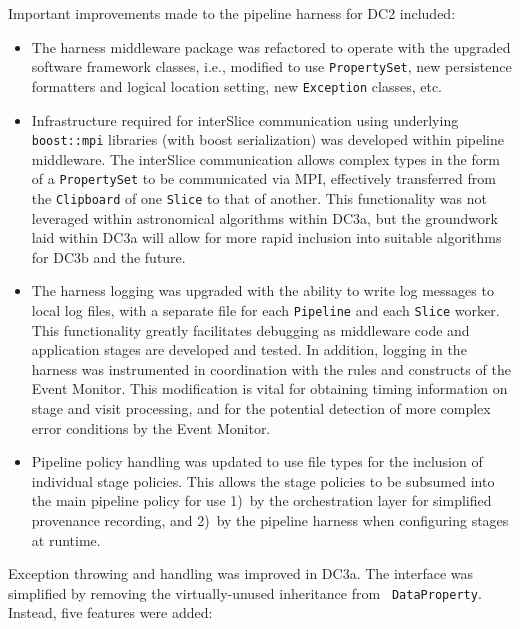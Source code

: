 Important improvements made to the pipeline harness for DC2 included:
\begin{itemize}
\item The harness middleware package was refactored to operate with the upgraded
software framework classes, i.e., modified to use {\tt PropertySet},
new persistence formatters and logical location setting, new {\tt Exception} classes, etc.
\item Infrastructure required for interSlice communication using underlying {\tt boost::mpi}
libraries (with boost serialization) was developed within pipeline middleware.
The interSlice communication allows complex types in the form of a {\tt PropertySet} to be
communicated via MPI, effectively transferred from the {\tt Clipboard} of
one {\tt Slice} to that of another.
This functionality was not leveraged within astronomical algorithms within DC3a, but
the groundwork laid within DC3a will allow for more rapid inclusion into suitable
algorithms for DC3b and the future.
\item The harness logging was upgraded with the ability to write log messages to
local log files, with a separate file for each {\tt Pipeline}
and each {\tt Slice} worker.
This functionality greatly facilitates debugging as middleware code and application
stages are developed and tested.  In addition, logging in the harness
was instrumented in coordination with the rules and constructs of the Event Monitor.
This modification is vital for obtaining timing information on stage and visit processing,
and for the potential detection of more complex error conditions by the Event Monitor.
\item Pipeline policy handling was updated to use file types for the inclusion of 
individual stage policies. This allows the stage policies to be subsumed into 
the main pipeline policy for use 1)~by the orchestration layer for 
simplified provenance recording, and 2)~by the pipeline harness when configuring stages 
at runtime.  
\end{itemize}



Exception throwing and handling was improved in DC3a. The interface was
simplified by removing the virtually-unused inheritance from {\tt
DataProperty}.  Instead, five features were added:

